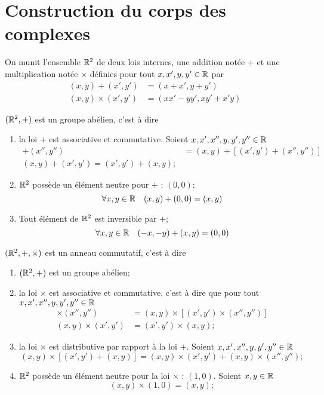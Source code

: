 \chapter{Construction du corps des complexes}

On munit l'ensemble \(\mathbb{R}^2\) de deux lois internes, une addition notée \(+\) et une multiplication notée \(\times\) définies pour tout \(x,x',y,y' \in \mathbb{R}\) par
\begin{align}
  (x,y)+(x',y') &= (x+x',y+y')\\
  (x,y)\times(x',y') &= (xx'-yy',xy'+x'y)
\end{align}

\begin{prop}
  \((\mathbb{R}^2,+)\) est un groupe abélien, c'est à dire
  \begin{enumerate}
  \item la loi \(+\) est associative et commutative. Soient \(x,x',x'',y,y',y'' \in \mathbb{R}\)
    \begin{align}
      [(x,y)+(x',y')]+(x'',y'')&=(x,y)+[(x',y')+(x'',y'')] \\
      (x,y)+(x',y')=(x',y')+(x,y);
    \end{align}
  \item \(\mathbb{R}^2\) possède un élément neutre pour \(+\) : \((0,0)\);
    \begin{equation}
      \forall x,y \in \mathbb{R} \quad (x,y)+(0,0)=(x,y)
    \end{equation}
  \item Tout élément de \(\mathbb{R}^2\) est inversible par \(+\);
    \begin{equation}
      \forall x,y \in \mathbb{R} \quad (-x,-y)+(x,y)=(0,0)
    \end{equation}
  \end{enumerate}
\end{prop}
\begin{prop}
  \((\mathbb{R}^2,+,\times)\) est un anneau commutatif, c'est à dire
  \begin{enumerate}
  \item \((\mathbb{R}^2,+)\) est un groupe abélien;
  \item la loi \(\times\) est associative et commutative, c'est à dire que pour tout \(x,x',x'',y,y',y'' \in \mathbb{R}\)
    \begin{align}
      [(x,y)\times(x',y')]\times (x'',y'')&=(x,y)\times [(x',y')\times (x'',y'')] \\
      (x,y)\times (x',y')&=(x',y')\times (x,y);
    \end{align}
  \item la loi \(\times\) est distributive par rapport à la loi \(+\). Soient \(x,x',x'',y,y',y'' \in \mathbb{R}\) 
    \begin{equation}
      (x,y) \times [(x',y')+(x,y)]= (x,y) \times (x',y') +(x,y) \times (x'',y'');
    \end{equation}
  \item \(\mathbb{R}^2\) possède un élément neutre pour la loi \(\times\) : \((1,0)\). Soient \(x,y \in \mathbb{R}\)
    \begin{equation}
      (x,y)\times (1,0)=(x,y);
    \end{equation}
  \end{enumerate}
\end{prop}

